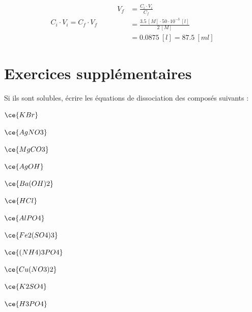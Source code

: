 \documentclass[
  11pt,
  a4paper,
  openany]{book}
\begin{document}
\begin{Answer}
\[
\begin{split}
  C_i \cdot V_i = C_f \cdot V_f
\end{split}
\qquad
\begin{split}
  V_f &= \frac{C_i \cdot V_i}{C_f} \\
  &= \frac{3.5\ [M] \cdot 50 \cdot 10^{-3}\ [l] }{2\ [M]} \\
  &= 0.0875\ [l] = 87.5\ [ml]
\end{split}
\]

\end{Answer}

\section{Exercices supplémentaires}\label{exercices-suppluxe9mentaires-7}

\begin{Exercise}

Si ils sont solubles, écrire les équations de dissociation des composés suivants :

\begin{multicols}{2}
\(\ce{KBr}\)

\(\ce{AgNO3}\)

\(\ce{MgCO3}\)

\(\ce{AgOH}\)

\(\ce{Ba(OH)2}\)

\(\ce{HCl}\)

\(\ce{AlPO4}\)

\(\ce{Fe2(SO4)3}\)

\(\ce{(NH4)3PO4}\)

\(\ce{Cu(NO3)2}\)

\(\ce{K2SO4}\)

\(\ce{H3PO4}\)

\end{multicols}

\end{Exercise}
\end{document}
